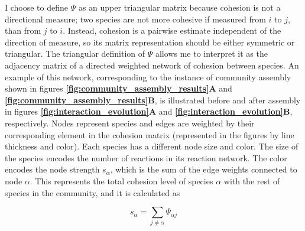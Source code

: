 \documentclass[titlepage,11pt]{article}
\begin{document}
\begin{linenumbers}
\begin{singlespace}
					I choose to define $ \Psi $ as an upper triangular matrix because  cohesion is not a directional measure; two species are not more cohesive if measured from $ i $ to $ j $, than from $ j $ to $ i $. Instead, cohesion is a pairwise estimate independent of the direction of measure, so its matrix representation should be either symmetric or triangular. The triangular definition of $ \Psi $ allows me to  interpret it as the adjacency matrix of a directed weighted network of cohesion between species. An example of this network, corresponding to the instance of community assembly shown in figures \textbf{\ref{fig:community_assembly_results}A} and \textbf{\ref{fig:community_assembly_results}B}, is illustrated before and after assembly in figures \textbf{\ref{fig:interaction_evolution}A} and \textbf{\ref{fig:interaction_evolution}B}, respectively. Nodes represent species and edges are weighted by their corresponding element in the cohesion matrix (represented in the figures by line thickness and color). Each species has a different node size and color. The size of the species encodes the number of reactions in its reaction network. The color encodes the node strength $ s_{\alpha} $, which is the sum of the edge weights connected to node $ \alpha $. This represents the total cohesion level of species $ \alpha $ with the rest of species in the community, and it is calculated as
\begin{linenomath*}
	\begin{equation}
		s_{\alpha} = \sum_{j \neq \alpha} \Psi_{\alpha j}
	\end{equation}
\end{linenomath*}

\end{singlespace}
\end{linenumbers}
\end{document}
